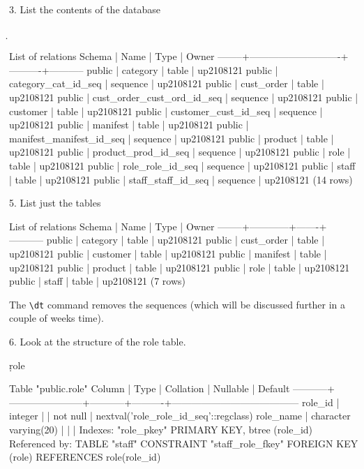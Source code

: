 3. List the contents of the database
\begin{sql}
\d
\end{sql}
\begin{pseudo*}
                    List of relations
Schema |            Name            |   Type   |   Owner   
--------+----------------------------+----------+-----------
public | category                   | table    | up2108121
public | category_cat_id_seq        | sequence | up2108121
public | cust_order                 | table    | up2108121
public | cust_order_cust_ord_id_seq | sequence | up2108121
public | customer                   | table    | up2108121
public | customer_cust_id_seq       | sequence | up2108121
public | manifest                   | table    | up2108121
public | manifest_manifest_id_seq   | sequence | up2108121
public | product                    | table    | up2108121
public | product_prod_id_seq        | sequence | up2108121
public | role                       | table    | up2108121
public | role_role_id_seq           | sequence | up2108121
public | staff                      | table    | up2108121
public | staff_staff_id_seq         | sequence | up2108121
(14 rows)
\end{pseudo*}
5. List just the tables
\begin{sql}
\dt
\end{sql}
\begin{pseudo*}
            List of relations
Schema |    Name    | Type  |   Owner
--------+------------+-------+-----------
public | category   | table | up2108121
public | cust_order | table | up2108121
public | customer   | table | up2108121
public | manifest   | table | up2108121
public | product    | table | up2108121
public | role       | table | up2108121
public | staff      | table | up2108121
(7 rows)
\end{pseudo*}
The \verb|\dt| command removes the sequences (which will be discussed further in a couple of weeks time).

6. Look at the structure of the role table.
\begin{sql}
\d role
\end{sql}
\begin{pseudo*}
Table "public.role"
Column   |         Type          | Collation | Nullable |                Default
-----------+-----------------------+-----------+----------+---------------------------------------
role_id   | integer               |           | not null | nextval('role_role_id_seq'::regclass)
role_name | character varying(20) |           |          |
Indexes:
    "role_pkey" PRIMARY KEY, btree (role_id)
Referenced by:
    TABLE "staff" CONSTRAINT "staff_role_fkey" FOREIGN KEY (role) REFERENCES role(role_id)
\end{pseudo*}

